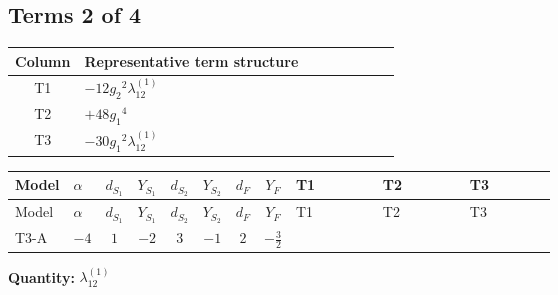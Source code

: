 \documentclass[8pt]{article}
\begin{document}
\begin{landscape}
\subsection*{Terms 2 of 4}
\begin{center}
\begin{tabular}{@{}c >{\raggedright\arraybackslash}p{0.82\linewidth}@{}}
\toprule
Column & Representative term structure \\
\midrule
T1 & \(\displaystyle -12 {g_2}^2 {\lambda_{12}^{(1)}}\) \\
\midrule
T2 & \(\displaystyle +48 {g_1}^4\) \\
\midrule
T3 & \(\displaystyle -30 {g_1}^2 {\lambda_{12}^{(1)}}\) \\
\midrule
\bottomrule
\end{tabular}
\end{center}
\smallskip
\tiny
\begin{longtable}{@{}llcccccc >{\raggedright\arraybackslash}p{0.21\linewidth} >{\raggedright\arraybackslash}p{0.21\linewidth} >{\raggedright\arraybackslash}p{0.21\linewidth}@{}}
\toprule
Model & $\alpha$ & $d_{S_1}$ & $Y_{S_1}$ & $d_{S_2}$ & $Y_{S_2}$ & $d_F$ & $Y_F$ & T1 & T2 & T3 \\
\midrule
\endfirsthead
\toprule
Model & $\alpha$ & $d_{S_1}$ & $Y_{S_1}$ & $d_{S_2}$ & $Y_{S_2}$ & $d_F$ & $Y_F$ & T1 & T2 & T3 \\
\midrule
\endhead
T3-A & $-4$ & $1$ & $-2$ & $3$ & $-1$ & $2$ & $-\frac{3}{2}$ & \scriptsize\adjustbox{max width=\linewidth}{$\begin{gathered} -12 {g_2}^2 {\lambda_{12}^{(1)}}\end{gathered}$} & \scriptsize\adjustbox{max width=\linewidth}{$\begin{gathered} +48 {g_1}^4\end{gathered}$} & \scriptsize\adjustbox{max width=\linewidth}{$\begin{gathered} -30 {g_1}^2 {\lambda_{12}^{(1)}}\end{gathered}$} \\
\midrule
\bottomrule
\end{longtable}
\clearpage
\noindent\textbf{Quantity: }$\lambda_{12}^{(1)}$\par\smallskip

\end{landscape}
\end{document}
